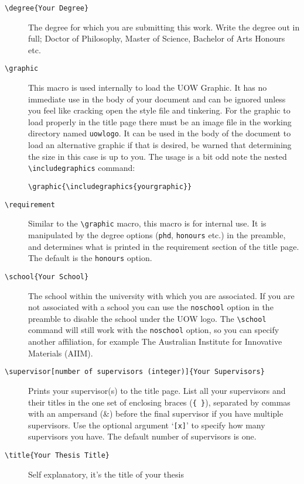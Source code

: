 \documentclass[12pt,oneside]{article}
\newcommand{\oporcom}[1]{\texttt{\color{Red}#1}} %
\newcommand{\comoptions}[1]{\texttt{\color{Green}#1}} %
\begin{document}
\begin{description}
    \item[\oporcom{\textbackslash{}degree}\comoptions{\{Your Degree\}}] The degree for which you are submitting this work. Write the degree out in full; Doctor of Philosophy, Master of Science, Bachelor of Arts Honours etc.
    
    \item[\oporcom{\textbackslash{}graphic}] This macro is used internally to load the UOW Graphic. It has no immediate use in the body of your document and can be ignored unless you feel like cracking open the style file and tinkering. For the graphic to load properly in the title page there must be an image file in the working directory named \texttt{uow\textunderscore{}logo}. It can be used in the body of the document to load an alternative graphic if that is desired, be warned that determining the size in this case is up to you.
    The usage is a bit odd note the nested \oporcom{\textbackslash{}includegraphics} command:
    
    \oporcom{\textbackslash{}graphic}\comoptions{\{\textbackslash{}includegraphics\{yourgraphic\}\}}
    
    \item[\oporcom{\textbackslash{}requirement}] Similar to the \oporcom{\textbackslash{}graphic} macro, this macro is for internal use. It is manipulated by the degree options (\oporcom{phd}, \oporcom{honours} etc.) in the preamble, and determines what is printed in the requirement section of the title page. The default is the \oporcom{honours} option.
    
    \item[\oporcom{\textbackslash{}school}\comoptions{\{Your School\}}] The school within the university with which you are associated. If you are not associated with a school you can use the \oporcom{noschool} option in the preamble to disable the school under the UOW logo. The \oporcom{\textbackslash{}school} command will still work with the \oporcom{noschool} option, so you can specify another affiliation, for example The Australian Institute for Innovative Materials (AIIM).
    
    \item[\oporcom{\textbackslash{}supervisor}\comoptions{[number of supervisors (integer)]\{Your Supervisors\}}] Prints your supervisor(s) to the title page. List all your supervisors and their titles in the one set of enclosing braces (\texttt{\{ \}}), separated by commas with an ampersand (\&) before the final supervisor if you have multiple supervisors. Use the optional argument `\texttt{[x]}' to specify how many supervisors you have. The default number of supervisors is one.
    
    \item[\oporcom{\textbackslash{}title}\comoptions{\{Your Thesis Title\}}] Self explanatory, it's the title of your thesis
\end{description}
\end{document}
